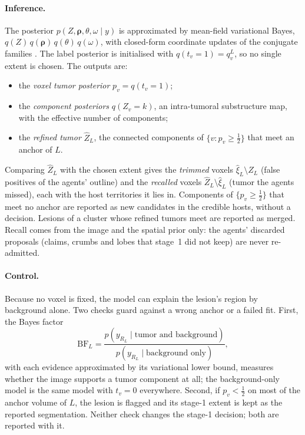\documentclass[fleqn,10pt]{olplainarticle}
\begin{document}
\paragraph{Inference.} The posterior $p(Z,\boldsymbol\rho,\theta,\omega\mid y)$ is approximated by mean-field variational
Bayes, $q(Z)\,q(\boldsymbol\rho)\,q(\theta)\,q(\omega)$, with closed-form coordinate updates of the conjugate families
\cite{gao2023bayeseg}. The label posterior is initialised with $q(t_v=1)=q^L_v$, so no single extent is chosen. The outputs
are:
\begin{itemize}
\item the \emph{voxel tumor posterior} $p_v=q(t_v=1)$;
\item the \emph{component posteriors} $q(Z_v=k)$, an intra-tumoral substructure map, with the effective number of components;
\item the \emph{refined tumor} $\hat Z_L$, the connected components of $\{v:p_v\ge\tfrac12\}$ that meet an anchor of $L$.
\end{itemize}
Comparing $\hat Z_L$ with the chosen extent gives the \emph{trimmed} voxels $\hat\xi_L\setminus\hat Z_L$ (false positives
of the agents' outline) and the \emph{recalled} voxels $\hat Z_L\setminus\hat\xi_L$ (tumor the agents missed), each with
the host territories it lies in. Components of $\{p_v\ge\tfrac12\}$ that meet no anchor are reported as new candidates in the
credible hosts, without a decision. Lesions of a cluster whose refined tumors meet are reported as merged. Recall comes from
the image and the spatial prior only: the agents' discarded proposals (claims, crumbs and lobes that stage~1 did not keep)
are never re-admitted.

\paragraph{Control.} Because no voxel is fixed, the model can explain the lesion's region by background alone. Two checks
guard against a wrong anchor or a failed fit. First, the Bayes factor
\begin{equation}
\label{eq:stage2_bf}
\mathrm{BF}_L=\frac{p(y_{R_L}\mid\text{tumor and background})}{p(y_{R_L}\mid\text{background only})},
\end{equation}
with each evidence approximated by its variational lower bound, measures whether the image supports a tumor component at
all; the background-only model is the same model with $t_v=0$ everywhere. Second, if $p_v<\tfrac12$ on most of the anchor
volume of $L$, the lesion is flagged and its stage-1 extent is kept as the reported segmentation. Neither check changes the
stage-1 decision; both are reported with it.
\end{document}
